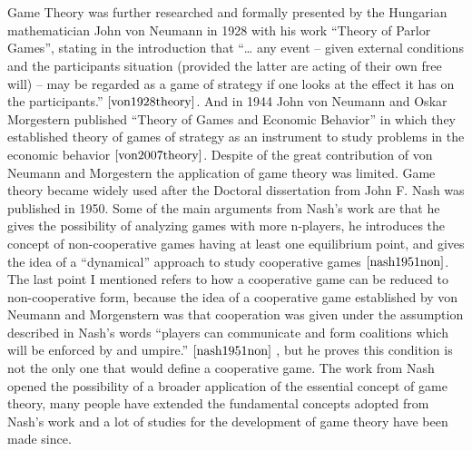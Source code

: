 \\\\ Game Theory was further researched and formally presented by the Hungarian mathematician John von Neumann in 1928 with his work “Theory of Parlor Games”, stating in the introduction that ``… any event – given external conditions and the participants situation (provided the latter are acting of their own free will) – may be regarded as a game of strategy if one looks at the effect it has on the participants.'' $\cite{von1928theory}$. And in 1944 John von Neumann and Oskar Morgestern published ``Theory of Games and Economic Behavior'' in which they established theory of games of strategy as an instrument to study problems in the economic behavior $\cite{von2007theory}$. 
Despite of the great contribution of von Neumann and Morgestern the application of game theory was limited. Game theory became widely used after the Doctoral dissertation from John F. Nash was published in 1950. Some of the main arguments from Nash’s work are that he gives the possibility of analyzing games with more n-players, he introduces the concept of non-cooperative games having at least one equilibrium point, and gives the idea of a “dynamical” approach to study cooperative games $\cite{nash1951non}$. The last point I mentioned refers to how a cooperative game can be reduced to non-cooperative form, because the idea of a cooperative game established by von Neumann and Morgenstern was that cooperation was given under the assumption described in Nash’s words “players can communicate and form coalitions which will be enforced by and umpire.” $\cite{nash1951non}$ , but he proves this condition is not the only one that would define a cooperative game. The work from Nash opened the possibility of a broader application of the essential concept of game theory, many people have extended the fundamental concepts adopted from Nash's work and a lot of studies for the development of game theory have been made since.

